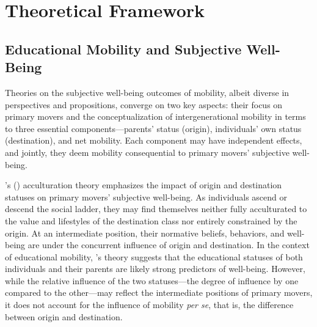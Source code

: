 \section{Theoretical Framework}
\label{sec:ch2-theoretical-framework}

\subsection{Educational Mobility and Subjective Well-Being}

Theories on the subjective well-being outcomes of mobility, albeit diverse in perspectives and propositions, converge on two key aspects: their focus on primary movers and the conceptualization of intergenerational mobility in terms to three essential components—parents' status (origin), individuals' own status (destination), and net mobility. Each component may have independent effects, and jointly, they deem mobility consequential to primary movers' subjective well-being.

\citeauthor{blauSocialMobilityInterpersonal1956}'s (\citeyear{blauSocialMobilityInterpersonal1956})
acculturation theory emphasizes the impact of origin and destination statuses on primary movers' subjective well-being. As individuals ascend or descend the social ladder, they may find themselves neither fully acculturated to the value and lifestyles of the destination class nor entirely constrained by the origin. At an intermediate position, their normative beliefs, behaviors, and well-being are under the concurrent influence of origin and destination. In the context of educational mobility, \citeauthor{blauSocialMobilityInterpersonal1956}'s theory suggests that the educational statuses of both individuals and their parents are likely strong predictors of well-being. However, while the relative influence of the two statuses—the degree of influence by one compared to the other—may reflect the intermediate positions of primary movers, it does not account for the influence of mobility \textit{per se}, that is, the difference between origin and destination.

